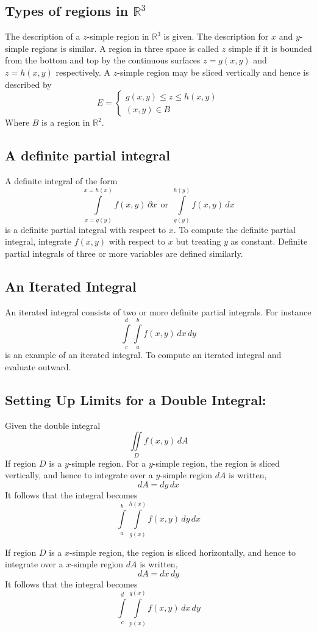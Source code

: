 \documentclass[14pt]{article}
\begin{document}
    \subsection{Types of regions in $\mathbb{R}^3$}
    The description of a $z$-simple region in $\mathbb{R}^3$ is given. The description for $x$ and $y$-simple regions is similar.
    A region in three space is called $z$ simple if it is bounded from the bottom and top by the continuous surfaces $z=g(x,y)$ and $z=h(x,y)$ respectively. A $z$-simple region may be sliced vertically and hence is described by 
    $$E=\left\{\begin{array}{lr}
        g(x,y)\leq z\leq h(x,y)\\
        (x,y)\in B
    \end{array}\right.$$
    Where $B$ is a region in $\mathbb{R}^2$.
    \subsection{A definite partial integral}
    A definite integral of the form 
    $$\int\limits_{x=g(y)}^{x=h(x)}f(x,y)\, \partial x\ \ \mathrm{ or }\ \ \int\limits_{g(y)}^{h(y)}f(x,y)\, dx$$
    is a definite partial integral with respect to $x$. To compute the definite partial integral, integrate $f(x,y)$ with respect to $x$ but treating $y$ as constant. Definite partial integrals of three or more variables are defined similarly.
    \subsection{An Iterated Integral}
    An iterated integral consists of two or more definite partial integrals. For instance
    $$\int\limits_c^d\int\limits_a^b f(x,y)\, dx\, dy$$
    is an example of an iterated integral. To compute an iterated integral and evaluate outward.
    \subsection{Setting Up Limits for a Double Integral:}
    Given the double integral
    $$\iint\limits_D f(x,y)\, dA$$
    If region $D$ is a $y$-simple region. For a $y$-simple region, the region is sliced vertically, and hence to integrate over a $y$-simple region $dA$ is written,
    $$dA=dy\, dx$$
    It follows that the integral becomes
    $$\int\limits_a^b\int\limits_{g(x)}^{h(x)}f(x,y)\, dy\, dx$$

    If region $D$ is a $x$-simple region, the region is sliced horizontally, and hence to integrate over a $x$-simple region $dA$ is written,
    $$dA=dx\, dy$$
    It follows that the integral becomes
    $$\int\limits_c^d\int\limits_{p(x)}^{q(x)}f(x,y)\, dx\, dy$$
\end{document}
